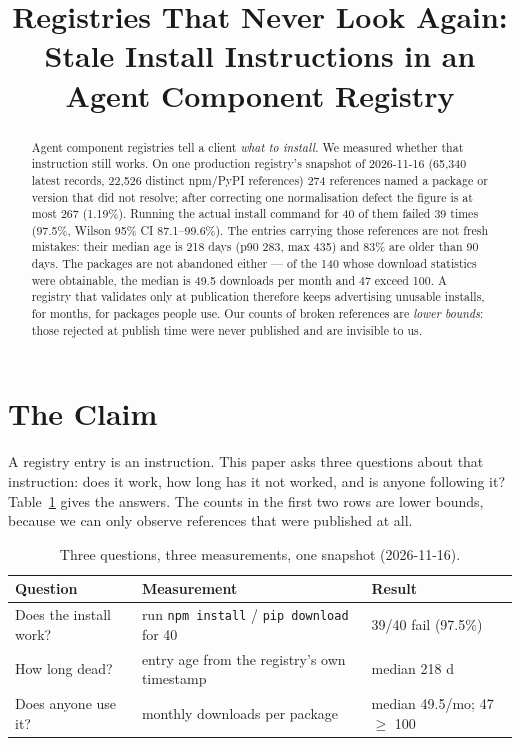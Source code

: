 \documentclass[acmsmall,screen,review,anonymous]{acmart}
\begin{document}
\title[Registries That Never Look Again]{Registries That Never Look Again: Stale Install Instructions in an Agent Component Registry}

\begin{abstract}
Agent component registries tell a client \emph{what to install}. We measured whether that
instruction still works. On one production registry's snapshot of 2026-11-16 (65{,}340
latest records, 22{,}526 distinct npm/PyPI references) 274 references named a package or
version that did not resolve; after correcting one normalisation defect the figure is at
most 267 (1.19\%). Running the actual install command for 40 of them failed 39 times
(97.5\%, Wilson 95\% CI 87.1--99.6\%). The entries carrying those references are not fresh
mistakes: their median age is 218 days (p90 283, max 435) and 83\% are older than 90 days.
The packages are not abandoned either --- of the 140 whose download statistics were
obtainable, the median is 49.5 downloads per month and 47 exceed 100. A registry that
validates only at publication therefore keeps advertising unusable installs, for months,
for packages people use. Our counts of broken references are \emph{lower bounds}: those rejected at
publish time were never published and are invisible to us.
\end{abstract}


\maketitle

\section{The Claim}
A registry entry is an instruction. This paper asks three questions about that instruction:
does it work, how long has it not worked, and is anyone following it? Table~\ref{tab:rq}
gives the answers. The counts in the first two rows are lower bounds, because we can only
observe references that were published at all.

\begin{table}[t]
\caption{Three questions, three measurements, one snapshot (2026-11-16).}
\label{tab:rq}
\small
\begin{tabular}{@{}lll@{}}
\toprule
Question & Measurement & Result\\
\midrule
Does the install work? & run \texttt{npm install} / \texttt{pip download} for 40 & 39/40 fail (97.5\%)\\
How long dead? & entry age from the registry's own timestamp & median 218 d\\
Does anyone use it? & monthly downloads per package & median 49.5/mo; 47 $\geq$ 100\\
\bottomrule
\end{tabular}
\end{table}
\end{document}
